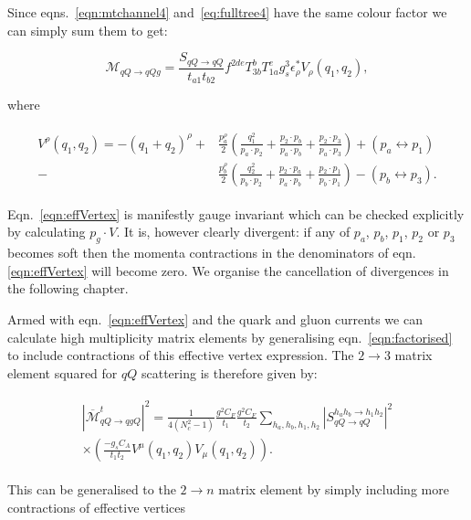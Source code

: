	Since eqns.~\eqref{eqn:mtchannel4} and~\eqref{eq:fulltree4} have the same colour factor we can simply sum
	them to get:

	\begin{equation}
		\mathcal{M}_{qQ\rightarrow qQg} = \frac{S_{qQ\rightarrow qQ}}{t_{a1}t_{b2}}
		f^{2de}T^b_{3b}T^e_{1a}g_s^3\epsilon^*_\rho V_\rho(q_1, q_2),
	\end{equation}

	where

	\begin{align}
	\begin{split}
		V^\rho(q_1, q_2) = -(q_1 + q_2)^\rho +
		&\frac{p_a^\rho}{2}\left(\frac{q^2_1}{p_a\cdot p_2} + \frac{p_2 \cdot p_b}{p_a \cdot p_b} +
		\frac{p_2 \cdot p_3}{p_a \cdot p_3}\right) + (p_a\leftrightarrow p_1) \\
		- &\frac{p_b^\rho}{2}\left(\frac{q^2_2}{p_b\cdot p_2} + \frac{p_2 \cdot p_a}{p_a \cdot p_b} +
		\frac{p_2 \cdot p_1}{p_b \cdot p_1}\right) - (p_b\leftrightarrow p_3).
		\label{eqn:effVertex}
	\end{split}
	\end{align}

	Eqn.~\eqref{eqn:effVertex} is manifestly gauge invariant which can be checked explicitly by
	calculating $p_g\cdot V$.  It is, however clearly divergent:  if any of $p_a$, $p_b$, $p_1$,
	$p_2$ or $p_3$ becomes soft then the momenta contractions in the denominators of eqn.
	\eqref{eqn:effVertex} will become zero.  We organise the cancellation of divergences in
	the following chapter.

	Armed with eqn.~\eqref{eqn:effVertex} and the quark and gluon currents we can calculate
	high multiplicity matrix elements by generalising eqn.~\eqref{eqn:factorised} to include
	contractions of this effective vertex expression.  The $2\rightarrow3$ matrix element
	squared for $qQ$ scattering is therefore given by:

	\begin{align}
	\begin{split}
		|\overline{\mathcal{M}}^t_{qQ\rightarrow qgQ}|^2 = \frac{1}{4(N_c^2-1)}
		\frac{g^2C_F}{t_1}\frac{g^2C_F}{t_2} \sum_{h_a, h_b, h_1, h_2}
		|S_{qQ\rightarrow qQ}^{h_ah_b\rightarrow h_1h_2}|^2\\
		\times\left(\frac{-g_sC_A}{t_1t_{2}}V^\mu(q_1, q_{2})V_\mu(q_1, q_{2})\right).
		\label{eqn:factorised2To3}
	\end{split}
	\end{align}

	This can be generalised to the $2\rightarrow n$ matrix element by simply including more
	contractions of effective vertices

